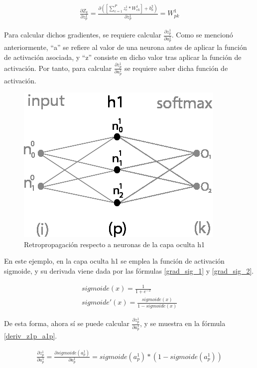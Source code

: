 \begin{gather}
	\frac{\partial Z_k}{\partial z^1_p} = \frac{\partial( [\sum_{c=1}^{P} z^1_c * W^1_{ck}] + b^2_k)}{\partial z^1_p} = W^1_{pk}
	\label{deriv_Zk_z1p}
\end{gather}

Para calcular dichos gradientes, se requiere calcular $\frac{\partial z^1_p}{\partial a^1_p}$. Como se mencionó anteriormente, ``a'' se refiere al valor de una neurona antes de aplicar la función de activación asociada, y ``z'' consiste en dicho valor tras aplicar la función de activación. Por tanto, para calcular $\frac{\partial z^1_p}{\partial a^1_p}$ se requiere saber dicha función de activación.

\begin{figure}[H]
	\centering
	\includegraphics[scale=0.35]{imagenes/nn_1_capa_h1.jpg}  
	\caption{Retropropagación respecto a neuronas de la capa oculta h1}
	\label{fig:nn_1_capa_h1}
\end{figure}

En este ejemplo, en la capa oculta h1 se emplea la función de activación sigmoide, y su derivada viene dada por las fórmulas \ref{grad_sig_1} y \ref{grad_sig_2}. 

\begin{gather}
	sigmoide(x) = \frac{1}{1+e^{-x}} \label{grad_sig_1} \\
	sigmoide'(x) = \frac{sigmoide(x)}{1-sigmoide(x)} \label{grad_sig_2}
\end{gather}

De esta forma, ahora sí se puede calcular $\frac{\partial z^1_p}{\partial a^1_p}$, y se muestra en la fórmula \ref{deriv_z1p_a1p}.

\begin{gather}
	\frac{\partial z^1_ p}{\partial a^1_p} = \frac{\partial sigmoide(a^1_p)}{\partial a^1_p} = sigmoide(a^1_p)*(1-sigmoide(a^1_p))
	\label{deriv_z1p_a1p}
\end{gather}

